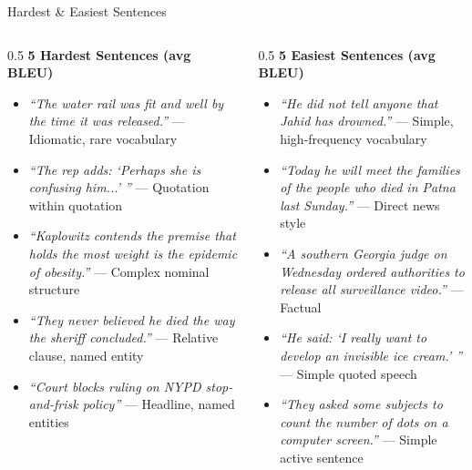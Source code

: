 \documentclass[aspectratio=169]{beamer}
\begin{document}
\begin{frame}{Hardest \& Easiest Sentences}
  \begin{columns}[T]
    \begin{column}{0.5\textwidth}
      \textbf{\textcolor{mtred}{5 Hardest Sentences (avg BLEU)}}
      \vspace{0.15cm}
      \begin{itemize}
        \small
        \item \textit{``The water rail was fit and well by the time it was released.''} --- Idiomatic, rare vocabulary
        \item \textit{``The rep adds: `Perhaps she is confusing him...' ''} --- Quotation within quotation
        \item \textit{``Kaplowitz contends the premise that holds the most weight is the epidemic of obesity.''} --- Complex nominal structure
        \item \textit{``They never believed he died the way the sheriff concluded.''} --- Relative clause, named entity
        \item \textit{``Court blocks ruling on NYPD stop-and-frisk policy''} --- Headline, named entities
      \end{itemize}
    \end{column}
    \begin{column}{0.5\textwidth}
      \textbf{\textcolor{mtgreen}{5 Easiest Sentences (avg BLEU)}}
      \vspace{0.15cm}
      \begin{itemize}
        \small
        \item \textit{``He did not tell anyone that Jahid has drowned.''} --- Simple, high-frequency vocabulary
        \item \textit{``Today he will meet the families of the people who died in Patna last Sunday.''} --- Direct news style
        \item \textit{``A southern Georgia judge on Wednesday ordered authorities to release all surveillance video.''} --- Factual
        \item \textit{``He said: `I really want to develop an invisible ice cream.' ''} --- Simple quoted speech
        \item \textit{``They asked some subjects to count the number of dots on a computer screen.''} --- Simple active sentence
      \end{itemize}
    \end{column}
  \end{columns}
\end{frame}
\end{document}
